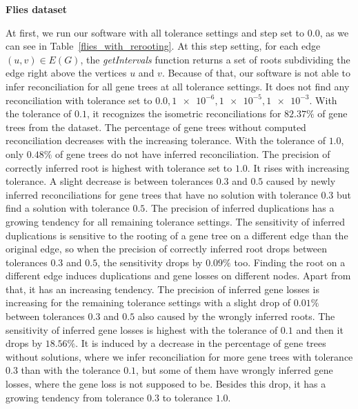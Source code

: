 \noindent \textbf{Flies dataset}

At first, we run our software with all tolerance settings and step set to $0.0$, as we can see in Table~\ref{flies_with_rerooting}. At this step setting, for each edge $(u, v) \in E(G)$, the \emph{getIntervals} function returns a set of roots subdividing the edge right above the vertices $u$ and $v$. Because of that, our software is not able to infer reconciliation for all gene trees at all tolerance settings. It does not find any reconciliation with tolerance set to $0.0, \num{1e-6}, \num{1e-5}, \num{1e-3}$. With the tolerance of $0.1$, it recognizes the isometric reconciliations for $82.37\%$ of gene trees from the dataset. The percentage of gene trees without computed reconciliation decreases with the increasing tolerance. With the tolerance of $1.0$, only $0.48\%$ of gene trees do not have inferred reconciliation. The precision of correctly inferred root is highest with tolerance set to $1.0$. It rises with increasing tolerance. A slight decrease is between tolerances $0.3$ and $0.5$ caused by newly inferred reconciliations for gene trees that have no solution with tolerance $0.3$ but find a solution with tolerance $0.5$. The precision of inferred duplications has a growing tendency for all remaining tolerance settings. The sensitivity of inferred duplications is sensitive to the rooting of a gene tree on a different edge than the original edge, so when the precision of correctly inferred root drops between tolerances $0.3$ and $0.5$, the sensitivity drops by $0.09\%$ too. Finding the root on a different edge induces duplications and gene losses on different nodes. Apart from that, it has an increasing tendency. The precision of inferred gene losses is increasing for the remaining tolerance settings with a slight drop of $0.01\%$ between tolerances $0.3$ and $0.5$ also caused by the wrongly inferred roots. The sensitivity of inferred gene losses is highest with the tolerance of $0.1$ and then it drops by $18.56\%$. It is induced by a decrease in the percentage of gene trees without solutions, where we infer reconciliation for more gene trees with tolerance $0.3$ than with the tolerance $0.1$, but some of them have wrongly inferred gene losses, where the gene loss is not supposed to be. Besides this drop, it has a growing tendency from tolerance $0.3$ to tolerance $1.0$.


